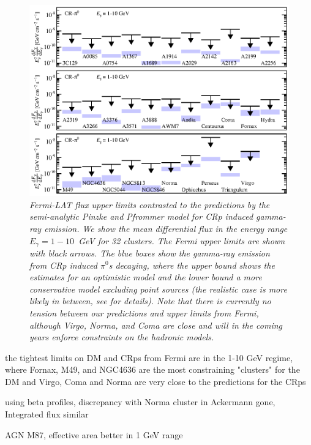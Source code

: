 \documentclass[10pt,aps,pra,reprint,amsmath,amsfonts,amssymb,showpacs]{revtex4-1}
\begin{document}
\begin{figure}
\begin{minipage}{2.0\columnwidth}
  \includegraphics[width=0.99\columnwidth]{figures/Fermi.comp.CR.diff.eps}
  \caption{\it Fermi-LAT flux upper limits contrasted to the
    predictions by the semi-analytic Pinzke and Pfrommer model for CRp
    induced gamma-ray emission. We show the mean differential flux in
    the energy range $E_\gamma=1-10$~GeV for 32 clusters. The Fermi
    upper limits are shown with black arrows. The blue boxes show the
    gamma-ray emission from CRp induced $\pi^0$\:s decaying, where the
    upper bound shows the estimates for an optimistic model and the
    lower bound a more conservative model excluding point sources (the
    realistic case is more likely in between, see
    \cite{2010MNRAS.409..449P} for details). Note that there is
    currently no tension between our predictions and upper limits from
    Fermi, although Virgo, Norma, and Coma are close and will in the
    coming years enforce constraints on the hadronic models.}
 \label{fig15}
\end{minipage}
\end{figure}

the tightest limits on DM and CRps from Fermi are in the 1-10 GeV
 regime, where Fornax, M49, and NGC4636 are the most constraining
 "clusters" for the DM and Virgo, Coma and Norma are very close to the
 predictions for the CRps

using beta profiles, discrepancy with Norma cluster in Ackermann gone,
Integrated flux similar

AGN M87, effective area better in 1 GeV range
\end{document}
